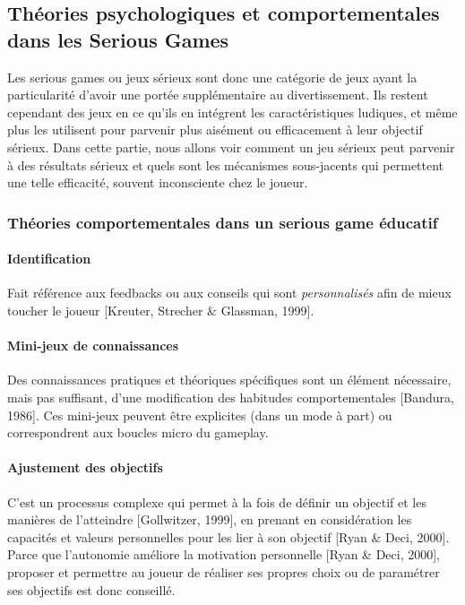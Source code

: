 \subsection{Théories psychologiques et comportementales dans les Serious Games}
Les serious games ou jeux sérieux sont donc une catégorie de jeux ayant la particularité d'avoir une portée supplémentaire au divertissement. Ils restent cependant des jeux en ce qu'ils en intégrent les caractéristiques ludiques, et même plus les utilisent pour parvenir plus aisément ou efficacement à leur objectif sérieux. Dans cette partie, nous allons voir comment un jeu sérieux  peut parvenir à des résultats sérieux et quels sont les mécanismes sous-jacents qui permettent une telle efficacité, souvent inconsciente chez le joueur.

		\subsubsection{Théories comportementales dans un serious game éducatif}
			\paragraph{Identification \\ \quad}
Fait référence aux feedbacks ou aux conseils qui sont \emph{personnalisés} afin de mieux toucher le joueur [Kreuter, Strecher \& Glassman, 1999]. 
			\paragraph{Mini-jeux de connaissances \\ \quad}
Des connaissances pratiques et théoriques spécifiques sont un élément nécessaire, mais pas suffisant, d’une modification des habitudes comportementales [Bandura, 1986]. Ces mini-jeux peuvent être explicites (dans un mode à part) ou correspondrent aux boucles micro du gameplay.
			\paragraph{Ajustement des objectifs \\ \quad}
C’est un processus complexe qui permet à la fois de définir un objectif et les manières de l’atteindre [Gollwitzer, 1999], en prenant en considération les capacités et valeurs personnelles pour les lier à son objectif [Ryan \& Deci, 2000]. Parce que l’autonomie améliore la motivation personnelle [Ryan \& Deci, 2000], proposer et permettre au joueur de réaliser ses propres choix ou de paramétrer ses objectifs est donc conseillé.
